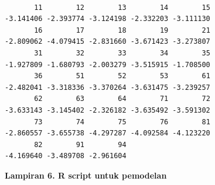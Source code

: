 \begin{verbatim}

       11        12        13        14        15
-3.141406 -2.393774 -3.124198 -2.332203 -3.111130
       16        17        18        19        21
-2.809062 -4.079415 -2.831660 -3.671423 -3.273807
       31        32        33        34        35
-1.927809 -1.680793 -2.003279 -3.515915 -1.708500
       36        51        52        53        61
-2.482041 -3.318336 -3.370264 -3.631475 -3.239257
       62        63        64        71        72
-3.633143 -3.145402 -2.326182 -3.635492 -3.591302
       73        74        75        76        81
-2.860557 -3.655738 -4.297287 -4.092584 -4.123220
       82        91        94
-4.169640 -3.489708 -2.961604

\end{verbatim}

\newpage

\textbf{Lampiran 6. R script untuk pemodelan}

